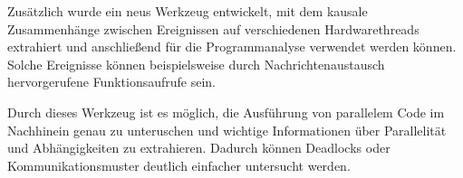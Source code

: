 Zusätzlich wurde ein neus Werkzeug entwickelt, mit dem kausale Zusammenhänge 
zwischen Ereignissen auf verschiedenen Hardwarethreads extrahiert und 
anschließend für die Programmanalyse verwendet werden können. Solche Ereignisse 
können beispielsweise durch Nachrichtenaustausch hervorgerufene 
Funktionsaufrufe sein.

Durch dieses Werkzeug ist es möglich, die Ausführung von parallelem Code im 
Nachhinein genau zu unteruschen und wichtige Informationen über Parallelität 
und Abhängigkeiten zu extrahieren. Dadurch können Deadlocks oder 
Kommunikationsmuster deutlich einfacher untersucht werden.

% 
% 


